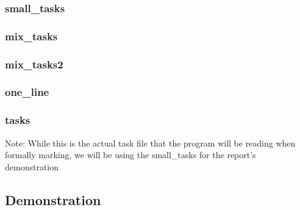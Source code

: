 \documentclass[a4paper, 12pt, titlepage]{article}
\begin{document}
\subsubsection{small\_tasks}


\subsubsection{mix\_tasks}


\subsubsection{mix\_tasks2}


\subsubsection{one\_line}


\subsubsection{tasks}
\begin{multicols}{4}

\end{multicols}

Note: While this is the actual task file that the program will be reading when
formally marking, we will be using the small\_tasks for the report's
demonstration
\newpage

\subsection{Demonstration}

\newpage
\end{document}
